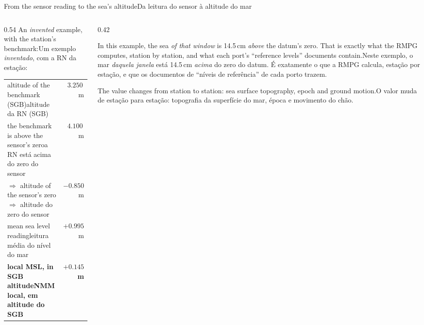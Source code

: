 \documentclass[aspectratio=169,11pt]{beamer}
\newcommand{\tr}[2]{\ifEN#2\else#1\fi}
\newcommand{\bnum}[1]{\ifmmode\textcolor{mTeal}{\mathbf{#1}}\else\textbf{\textcolor{mTeal}{#1}}\fi}
\begin{document}
\begin{frame}{\tr{Da leitura do sensor à altitude do mar}{From the sensor reading to the sea's altitude}}
  \begin{columns}[T]
    \begin{column}{0.54\textwidth}
      \small
      \tr{Um exemplo \emph{inventado}, com a RN da estação:}{An \emph{invented} example, with the
      station's benchmark:}
      \medskip

      \renewcommand{\arraystretch}{1.15}
      \footnotesize
      \begin{tabular}{@{}lr@{}}
        \toprule
        \tr{altitude da RN (SGB)}{altitude of the benchmark (SGB)} & $\num{3.250}$\,m \\
        \tr{a RN está acima do zero do sensor}{the benchmark is above the sensor's zero} & $\num{4.100}$\,m \\
        \tr{$\Rightarrow$ altitude do zero do sensor}{$\Rightarrow$ altitude of the sensor's zero} & $-\num{0.850}$\,m \\
        \tr{leitura média do nível do mar}{mean sea level reading} & $+\num{0.995}$\,m \\
        \midrule
        \textbf{\tr{NMM local, em altitude do SGB}{local MSL, in SGB altitude}} & \bnum{$+\num{0.145}$\,m} \\
        \bottomrule
      \end{tabular}
    \end{column}
    \begin{column}{0.42\textwidth}
      \begin{ideia}[title={\tr{O que significa}{What it means}}]
        \scriptsize\tr{Neste exemplo, o mar \emph{daquela janela} está \num{14.5}\,cm \emph{acima}
        do zero do datum. É exatamente o que a RMPG calcula, estação por estação, e que os
        documentos de ``níveis de referência'' de cada porto trazem.}{In this example, the sea
        \emph{of that window} is \num{14.5}\,cm \emph{above} the datum's zero. That is exactly
        what the RMPG computes, station by station, and what each port's ``reference levels''
        documents contain.}
      \end{ideia}
      \medskip
      \begin{cuidado}[title={\tr{Cada porto é um caso}{Each port is a case}}]
        \scriptsize\tr{O valor muda de estação para estação: topografia da superfície do mar,
        época e movimento do chão.}{The value changes from station to station: sea surface
        topography, epoch and ground motion.}
      \end{cuidado}
    \end{column}
  \end{columns}
\end{frame}
\end{document}
